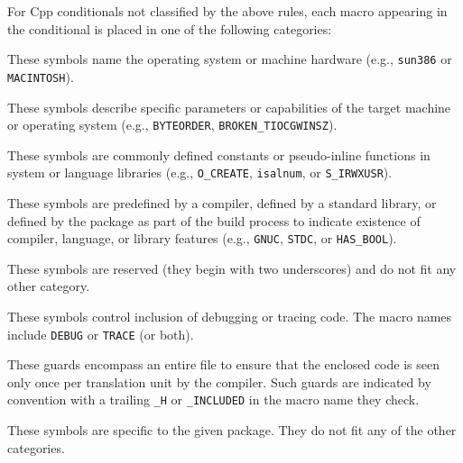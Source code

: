 \documentclass[10pt]{article}
\begin{document}
For Cpp conditionals not classified by the above rules, each macro
appearing in the conditional is placed in one of the following categories:

\begin{description}\itemsep 0pt \parskip 0pt

\item[Portability, machine]
  These symbols name the operating system or machine
  hardware (e.g., \texttt{sun386} or \texttt{MACINTOSH}).
      
\item[Portability, feature] These symbols describe specific parameters
      or capabilities of the target machine or operating system (e.g.,
      \texttt{BYTEORDER}, \verb|BROKEN_TIOCGWINSZ|).  
      

\item[Portability, system macro]
  These symbols are commonly defined constants or
  pseudo-inline functions in system or language libraries (e.g.,
  \verb|O_CREATE|, \texttt{isalnum}, or \verb|S_IRWXUSR|).

\item[Portability, language or library]
  These symbols are predefined by a compiler, defined by a standard
  library, or defined by the package as part of the build
  process to indicate existence of compiler, language, or library features
  (e.g., \texttt{GNUC}, \texttt{STDC}, or \verb|HAS_BOOL|).

\item[Miscellaneous system]
  These symbols are reserved (they begin with two underscores) and do
  not fit any other category.
      
\item[Debugging]
  These symbols control inclusion of debugging or tracing code.  The macro
  names include \texttt{DEBUG} or \texttt{TRACE} (or both).
      
\item[Multiple inclusion prevention]
  These guards encompass an entire file to ensure that the enclosed code is
  seen only once per translation unit by the compiler.  Such guards are
  indicated by convention with a trailing \verb|_H| or \verb|_INCLUDED| in the macro name
  they check.

\item[Package-specific] 
  These symbols are specific to the given package.  They do not fit any of
  the other categories.

\end{description}
\end{document}
